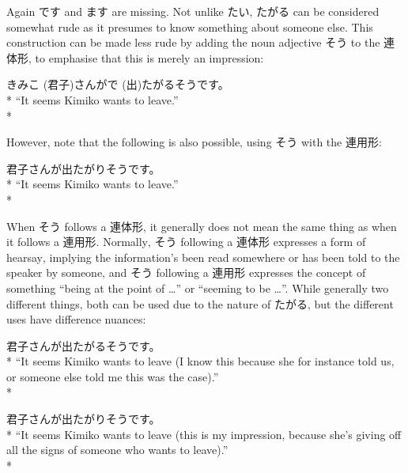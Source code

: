 \documentclass[11pt, b5paper, twoside, openright, onecolumn]{book}
\makeatletter
\newcommand*{\rubystack}[2]{{\relscale{0.5}%
  \begin{tabular}[b]{@{}c@{}}%
    {#1}\\%
   {\textscale{2}{#2}}%
  \end{tabular}}%
}
\DeclareRobustCommand*{\ruby}[2]{%
  \mbox{%
    \setlength{\parskip}{0ex}%
    \BeginAccSupp{method=pdfstringdef,ActualText={#1}}%
      \rubystack{\phantom{#2}}{#1}%
      \llap{%
        \rubystack{#2}{\phantom{#1}}%
      }%
    \EndAccSupp{}%
  }%
}
\renewcommand*{\ruby}[2]{#2 (#1)}%
\newenvironment{exampleblock}{
\setlength{\parindent}{0.6in}
\begin{minipage}[t]{\dimexpr\textwidth-\parindent}}
{\end{minipage}}
\makeatother
\begin{document}
Again です and ます are missing. Not unlike たい‚ たがる can be considered somewhat rude as it presumes to know something about someone else. This construction can be made less rude by adding the noun adjective そう to the 連体形‚ to emphasise that this is merely an impression:

\vspace{0.4cm}
\begin{exampleblock}
\ruby{君子}{きみこ}さんが\ruby{出}{で}たがるそうです。 \\* 
“It seems Kimiko wants to leave.” \\* 
\end{exampleblock}
\vspace{0.2cm}

However‚ note that the following is also possible‚ using そう with the 連用形:

\vspace{0.4cm}
\begin{exampleblock}
君子さんが出たがりそうです。 \\* 
“It seems Kimiko wants to leave.” \\* 
\end{exampleblock}
\vspace{0.2cm}

When そう follows a 連体形‚ it generally does not mean the same thing as when it follows a 連用形. Normally‚ そう following a 連体形 expresses a form of hearsay‚ implying the information’s been read somewhere or has been told to the speaker by someone‚ and そう following a 連用形 expresses the concept of something “being at the point of …” or “seeming to be …”. While generally two different things‚ both can be used due to the nature of たがる‚ but the different uses have difference nuances:

\vspace{0.4cm}
\begin{exampleblock}
君子さんが出たがるそうです。 \\* 
“It seems Kimiko wants to leave (I know this because she for instance told us‚ or someone else told me this was the case).” \\* 
\end{exampleblock}
\vspace{0.2cm}

\begin{exampleblock}
君子さんが出たがりそうです。 \\* 
“It seems Kimiko wants to leave (this is my impression‚ because she’s giving off all the signs of someone who wants to leave).” \\* 
\end{exampleblock}
\vspace{0.2cm}
\end{document}
